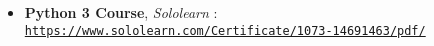 
\begin{itemize}

\item \textbf{Python 3 Course}, \emph{Sololearn}
  : \\
  {\texttt{\href{https://www.sololearn.com/Certificate/1073-14691463/pdf/}{https://www.sololearn.com/Certificate/1073-14691463/pdf/}}}
  
\end{itemize}
